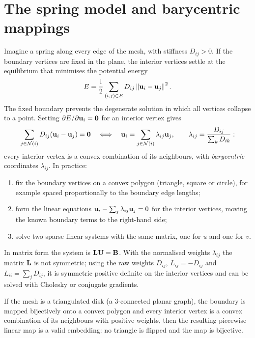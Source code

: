 
\section{The spring model and barycentric mappings}

Imagine a spring along every edge of the mesh, with stiffness $D_{ij}>0$. If the boundary vertices
are fixed in the plane, the interior vertices settle at the equilibrium that minimises the potential
energy
\begin{equation}
E=\frac12\sum_{(i,j)\in E}D_{ij}\left\lVert \mathbf{u}_i-\mathbf{u}_j\right\rVert^2 .
\end{equation}
The fixed boundary prevents the degenerate solution in which all vertices collapse to a point.
Setting $\partial E/\partial\mathbf{u}_i=\mathbf{0}$ for an interior vertex gives
\begin{equation}
\sum_{j\in\mathcal N(i)}D_{ij}(\mathbf{u}_i-\mathbf{u}_j)=\mathbf{0}\quad\Longleftrightarrow\quad
\mathbf{u}_i=\sum_{j\in\mathcal N(i)}\lambda_{ij}\mathbf{u}_j,\qquad \lambda_{ij}=\frac{D_{ij}}{\sum_kD_{ik}} :
\end{equation}
every interior vertex is a convex combination of its neighbours, with \emph{barycentric}
coordinates $\lambda_{ij}$. In practice:
\begin{enumerate}
  \item fix the boundary vertices on a convex polygon (triangle, square or circle), for example
  spaced proportionally to the boundary edge lengths;
  \item form the linear equations $\mathbf{u}_i-\sum_j\lambda_{ij}\mathbf{u}_j=0$ for the interior vertices,
  moving the known boundary terms to the right-hand side;
  \item solve two sparse linear systems with the same matrix, one for $u$ and one for $v$.
\end{enumerate}
In matrix form the system is $\mathbf{L}\mathbf U=\mathbf B$. With the normalised weights $\lambda_{ij}$ the
matrix $\mathbf{L}$ is not symmetric; using the raw weights $D_{ij}$, $L_{ij}=-D_{ij}$ and
$L_{ii}=\sum_jD_{ij}$, it is symmetric positive definite on the interior vertices and can be solved
with Cholesky or conjugate gradients.

\begin{theorem}
If the mesh is a triangulated disk (a 3-connected planar graph), the boundary is mapped
bijectively onto a convex polygon and every interior vertex is a convex combination of its
neighbours with positive weights, then the resulting piecewise linear map is a valid embedding:
no triangle is flipped and the map is bijective.
\end{theorem}

